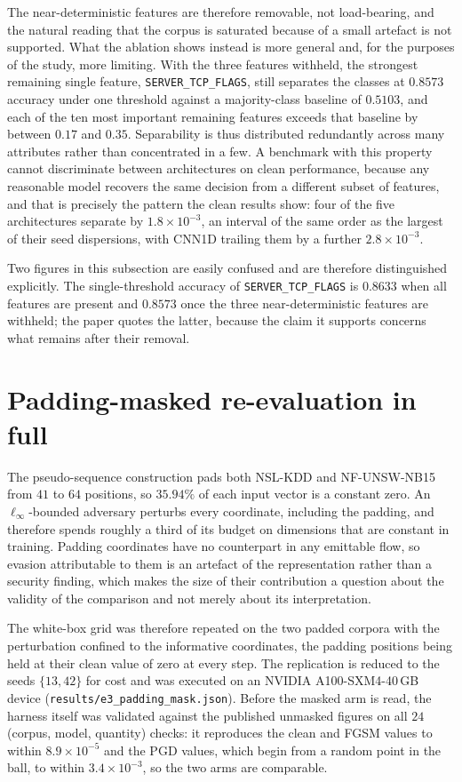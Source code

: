 \documentclass[11pt,a4paper]{article}
\begin{document}
The near-deterministic features are therefore removable, not
load-bearing, and the natural reading that the corpus is saturated
because of a small artefact is not supported. What the ablation shows
instead is more general and, for the purposes of the study, more
limiting. With the three features withheld, the strongest remaining
single feature, \texttt{SERVER\_TCP\_FLAGS}, still separates the
classes at $0.8573$ accuracy under one threshold against a
majority-class baseline of $0.5103$, and each of the ten most important
remaining features exceeds that baseline by between $0.17$ and $0.35$.
Separability is thus distributed redundantly across many attributes
rather than concentrated in a few. A benchmark with this property
cannot discriminate between architectures on clean performance, because
any reasonable model recovers the same decision from a different subset
of features, and that is precisely the pattern the clean results show:
four of the five architectures separate by $1.8\times10^{-3}$, an
interval of the same order as the largest of their seed dispersions,
with CNN1D trailing them by a further $2.8\times10^{-3}$.

Two figures in this subsection are easily confused and are therefore
distinguished explicitly. The single-threshold accuracy of
\texttt{SERVER\_TCP\_FLAGS} is $0.8633$ when all features are present
and $0.8573$ once the three near-deterministic features are withheld;
the paper quotes the latter, because the claim it supports concerns
what remains after their removal.

\section{Padding-masked re-evaluation in full}
\label{sup:pad}

The pseudo-sequence construction pads both NSL-KDD and NF-UNSW-NB15
from $41$ to $64$ positions, so $35.94\%$ of each input vector is a
constant zero. An $\ell_{\infty}$-bounded adversary perturbs every
coordinate, including the padding, and therefore spends roughly a third
of its budget on dimensions that are constant in training. Padding
coordinates have no counterpart in any emittable flow, so evasion
attributable to them is an artefact of the representation rather than a
security finding, which makes the size of their contribution a question
about the validity of the comparison and not merely about its
interpretation.

The white-box grid was therefore repeated on the two padded corpora
with the perturbation confined to the informative coordinates, the
padding positions being held at their clean value of zero at every
step. The replication is reduced to the seeds $\{13,42\}$ for cost and
was executed on an NVIDIA A100-SXM4-40\,GB device
(\texttt{results/e3\_padding\_mask.json}). Before the masked arm is
read, the harness itself was validated against the published unmasked
figures on all $24$ (corpus, model, quantity) checks: it reproduces the
clean and FGSM values to within $8.9\times10^{-5}$ and the PGD values,
which begin from a random point in the ball, to within
$3.4\times10^{-3}$, so the two arms are comparable.
\end{document}
